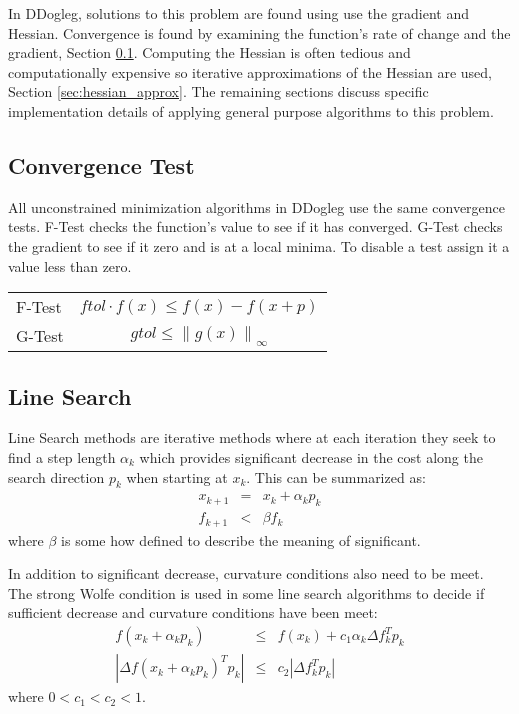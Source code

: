 \documentclass[peerreview,compsoc,onecolumn]{IEEEtran}
\newcommand{\norm}[1]{\left\lVert#1\right\rVert}
\begin{document}
In DDogleg, solutions to this problem are found using use the gradient and Hessian. Convergence is found by examining the function's rate of change and the gradient, Section \ref{sec:unmin_convergence}. Computing the Hessian is often tedious and computationally expensive so iterative approximations of the Hessian are used, Section \ref{sec:hessian_approx}. The remaining sections discuss specific implementation details of applying general purpose algorithms to this problem.

\subsection{Convergence Test}
\label{sec:unmin_convergence}

All unconstrained minimization algorithms in DDogleg use the same convergence tests. F-Test checks the function's value to see if it has converged. G-Test checks the gradient to see if it zero and is at a local minima. To disable a test assign it a value less than zero.

\begin{center}
\begin{tabular}{lc}
F-Test & $ftol \cdot f(x)  \leq f(x) - f(x+p)$ \\
G-Test & $gtol \leq \norm{g(x)}_\infty$ 
\end{tabular}
\end{center}
 
\subsection{Line Search}

Line Search methods are iterative methods where at each iteration they seek to find a step length $\alpha_k$ which provides significant decrease in the cost along the search direction $p_k$ when starting at $x_k$. This can be summarized as:
\begin{eqnarray}
x_{k+1} & = & x_k + \alpha_k p_k \\
f_{k+1} & < & \beta f_k
\end{eqnarray}
where $\beta$ is some how defined to describe the meaning of significant.

In addition to significant decrease, curvature conditions also need to be meet. The strong Wolfe condition is used in some line search algorithms to decide if sufficient decrease and curvature conditions have been meet:
\begin{eqnarray}
f(x_k + \alpha_k p_k) &\le& f(x_k) + c_1 \alpha_k \Delta f^T_k p_k \\
|\Delta f(x_k + \alpha_k p_k)^T p_k| &\le& c_2 |\Delta f_k^T p_k|
\end{eqnarray}
where $0 < c_1 < c_2 < 1$.
\end{document}
